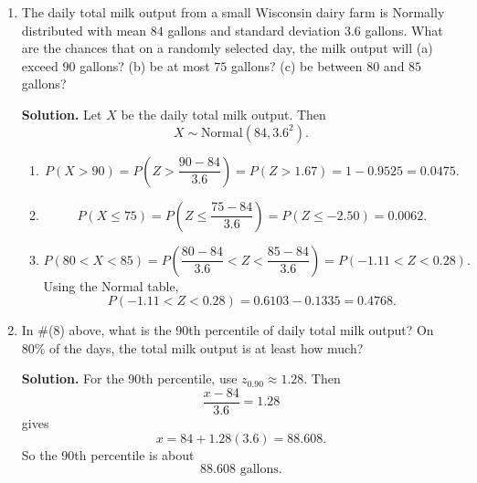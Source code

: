 \documentclass[12pt]{article}
\begin{document}
\begin{enumerate}[label=(\arabic*), leftmargin=*]
\par\medskip
\noindent\textbf{Solution.}
Since the sample comes from a Normal$(150,5^2)$ population,
\[
\overline{Y}\sim \mathrm{Normal}\!\left(150,\frac{5^2}{51}\right)
=\mathrm{Normal}\!\left(150,\frac{25}{51}\right).
\]
Therefore the pdf of $\overline{Y}$ is
\[
f_{\overline{Y}}(y)
=\frac{1}{\sqrt{2\pi(25/51)}}
\exp\!\left(-\frac{(y-150)^2}{2(25/51)}\right),
\qquad -\infty<y<\infty.
\]
Equivalently,
\[
f_{\overline{Y}}(y)
=\frac{\sqrt{51}}{5\sqrt{2\pi}}
\exp\!\left(-\frac{51(y-150)^2}{50}\right),
\qquad -\infty<y<\infty.
\]

Also, for a Normal sample,
\[
\frac{(n-1)S^2}{\sigma^2}\sim \chi^2_{n-1}.
\]
Here $n=51$ and $\sigma^2=25$, so
\[
\frac{50S^2}{25}=2S^2\sim \chi^2_{50}.
\]
Hence the pdf of $2S^2$ is the chi-square pdf with $50$ degrees of freedom:
\[
f_{2S^2}(t)
=\frac{1}{2^{25}\Gamma(25)}\,t^{24}e^{-t/2},
\qquad t>0.
\]

\item The daily total milk output from a small Wisconsin dairy farm is Normally distributed with mean $84$ gallons and standard deviation $3.6$ gallons. What are the chances that on a randomly selected day, the milk output will (a) exceed $90$ gallons? (b) be at most $75$ gallons? (c) be between $80$ and $85$ gallons?

\par\medskip
\noindent\textbf{Solution.}
Let $X$ be the daily total milk output. Then
\[
X\sim \mathrm{Normal}(84,3.6^2).
\]

\begin{enumerate}[label=(\alph*), itemsep=0.5em]
    \item
    \[
    P(X>90)=P\!\left(Z>\frac{90-84}{3.6}\right)
    =P(Z>1.67)=1-0.9525=0.0475.
    \]

    \item
    \[
    P(X\le 75)=P\!\left(Z\le\frac{75-84}{3.6}\right)
    =P(Z\le -2.50)=0.0062.
    \]

    \item
    \[
    P(80<X<85)=P\!\left(\frac{80-84}{3.6}<Z<\frac{85-84}{3.6}\right)
    =P(-1.11<Z<0.28).
    \]
    Using the Normal table,
    \[
    P(-1.11<Z<0.28)=0.6103-0.1335=0.4768.
    \]
\end{enumerate}

\item In \#(8) above, what is the 90th percentile of daily total milk output? On 80\% of the days, the total milk output is at least how much?

\par\medskip
\noindent\textbf{Solution.}
For the 90th percentile, use $z_{0.90}\approx 1.28$. Then
\[
\frac{x-84}{3.6}=1.28
\]
gives
\[
x=84+1.28(3.6)=88.608.
\]
So the 90th percentile is about
\[
88.608\text{ gallons}.
\]


\end{enumerate}
\end{document}
